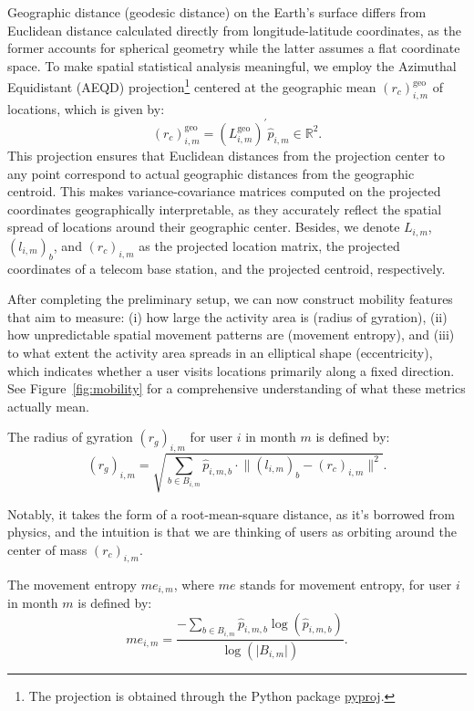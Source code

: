 Geographic distance (geodesic distance) on the Earth's surface differs from Euclidean distance calculated directly from longitude-latitude coordinates, as the former accounts for spherical geometry while the latter assumes a flat coordinate space.
To make spatial statistical analysis meaningful, we employ the Azimuthal Equidistant (AEQD) projection\footnote{The projection is obtained through the Python package \href{https://github.com/pyproj4/pyproj}{pyproj}.} centered at the geographic mean $(r_c)^{\text{geo}}_{i, m}$ of locations, which is given by:
\begin{equation}
(r_c)^{\text{geo}}_{i, m}
=
(L^{\text{geo}}_{i, m})^{'} \hat{p}_{i, m}
\in \mathbb{R}^2.
\end{equation}
This projection ensures that Euclidean distances from the projection center to any point correspond to actual geographic distances from the geographic centroid.
This makes variance-covariance matrices computed on the projected coordinates geographically interpretable, as they accurately reflect the spatial spread of locations around their geographic center. Besides, we denote $L_{i, m}$, $(l_{i, m})_b$, and $(r_c)_{i, m}$ as the projected location matrix, the projected coordinates of a telecom base station, and the projected centroid, respectively.

After completing the preliminary setup, we can now construct mobility features that aim to measure: (i) how large the activity area is (radius of gyration), (ii) how unpredictable spatial movement patterns are (movement entropy), and (iii) to what extent the activity area spreads in an elliptical shape (eccentricity), which indicates whether a user visits locations primarily along a fixed direction.
See Figure~\ref{fig:mobility} for a comprehensive understanding of what these metrics actually mean.


\begin{definition}
The radius of gyration $(r_g)_{i, m}$ for user $i$ in month $m$ is defined by:
\[
(r_g)_{i, m}
=
\sqrt{
    \sum_{ b \in B_{i, m}}
    \hat{p}_{i, m, b} \cdot \lVert (l_{i, m})_b - (r_c)_{i, m} \rVert^2
}.
\]
\end{definition}


Notably, it takes the form of a root-mean-square distance, as it's borrowed from physics, and the intuition is that we are thinking of users as orbiting around the center of mass $(r_c)_{i, m}$.


\clearpage\newpage
\begin{definition}
The movement entropy $me_{i, m}$, where $me$ stands for movement entropy, for user $i$ in month $m$ is defined by:
\[
me_{i, m}
=
\frac{
- \sum_{b \in B_{i, m}}
    \hat{p}_{i, m, b}
    \log(\hat{p}_{i, m, b})
}{
\log(\lvert B_{i, m} \rvert )
}.
\]
\end{definition}


